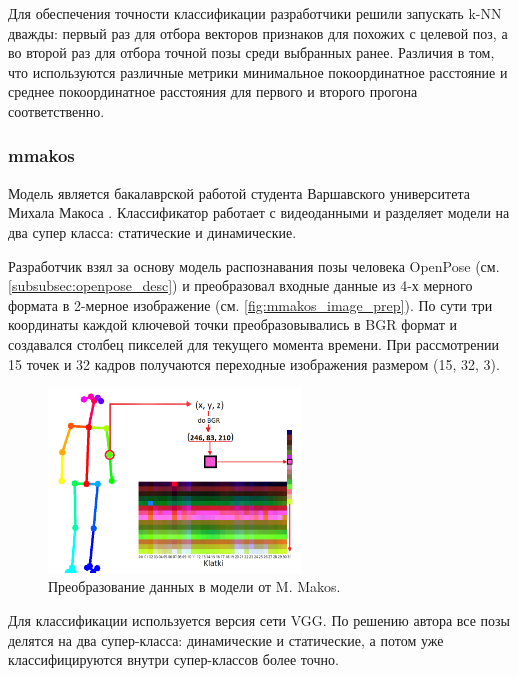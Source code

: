 Для обеспечения точности классификации разработчики решили запускать k-NN дважды: первый раз для отбора векторов признаков для похожих с целевой поз, а во второй раз для отбора точной позы среди выбранных ранее. Различия в том, что используются различные метрики минимальное покоординатное расстояние и среднее покоординатное расстояния для первого и второго прогона соответственно.



\subsubsection{mmakos}
\label{subsubsec:mmakos_desc}

Модель является бакалаврской работой студента Варшавского университета Михала Макоса \cite{mmakos}. Классификатор работает с видеоданными и разделяет модели на два супер класса: статические и динамические.

Разработчик взял за основу модель распознавания позы человека OpenPose (см. \autoref{subsubsec:openpose_desc}) и преобразовал входные данные из 4-х мерного формата в 2-мерное изображение (см. \autoref{fig:mmakos_image_prep}). По сути три координаты каждой ключевой точки преобразовывались в BGR формат и создавался столбец пикселей для текущего момента времени. При рассмотрении 15 точек и 32 кадров получаются переходные изображения размером (15, 32, 3).

\begin{figure}[h]
	\centering
	\includegraphics[width=0.6\textwidth]{./images/Classificators/MMakos_image_prep}
	\caption{Преобразование данных в модели от M. Makos. \cite{mmakos}}
	\label{fig:mmakos_image_prep}
\end{figure}
\hspace{1cm}

Для классификации используется версия сети VGG. По решению автора все позы делятся на два супер-класса: динамические и статические, а потом уже классифицируются внутри супер-классов более точно.



